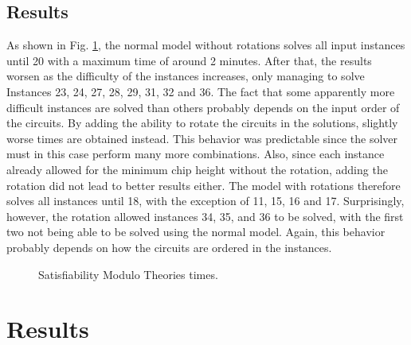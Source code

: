 \documentclass[a4paper, 12pt]{article}
\begin{document}
\subsection{Results}
As shown in Fig. \ref{fig:smt}, the normal model without rotations solves all input instances until 20 with a maximum time of around 2 minutes. After that, the results worsen as the difficulty of the instances increases, only managing to solve Instances 23, 24, 27, 28, 29, 31, 32 and 36. The fact that some apparently more difficult instances are solved than others probably depends on the input order of the circuits. By adding the ability to rotate the circuits in the solutions, slightly worse times are obtained instead. This behavior was predictable since the solver must in this case perform many more combinations. Also, since each instance already allowed for the minimum chip height without the rotation, adding the rotation did not lead to better results either. The model with rotations therefore solves all instances until 18, with the exception of 11, 15, 16 and 17. Surprisingly, however, the rotation allowed instances 34, 35, and 36 to be solved, with the first two not being able to be solved using the normal model. Again, this behavior probably depends on how the circuits are ordered in the instances.

\begin{figure}
    \centering
        \caption{Satisfiability Modulo Theories times.}
    \label{fig:smt}  
\end{figure}

\clearpage

\section{Results}
\end{document}
